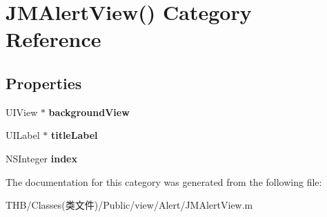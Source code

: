 \hypertarget{category_j_m_alert_view_07_08}{}\section{J\+M\+Alert\+View() Category Reference}
\label{category_j_m_alert_view_07_08}
\subsection*{Properties}
\begin{DoxyCompactItemize}
\item 
\mbox{\label{category_j_m_alert_view_07_08_ace9aaa5478fa7ee647b1bf8eb70a488f}} 
U\+I\+View $\ast$ {\bfseries background\+View}
\item 
\mbox{\label{category_j_m_alert_view_07_08_accbcedbc2e30911c6350f59e9ce6318a}} 
U\+I\+Label $\ast$ {\bfseries title\+Label}
\item 
\mbox{\label{category_j_m_alert_view_07_08_a690c3c8d687551e6904ab3f2d813e9b0}} 
N\+S\+Integer {\bfseries index}
\end{DoxyCompactItemize}


The documentation for this category was generated from the following file\+:\begin{DoxyCompactItemize}
\item 
T\+H\+B/\+Classes(类文件)/\+Public/view/\+Alert/J\+M\+Alert\+View.\+m\end{DoxyCompactItemize}
